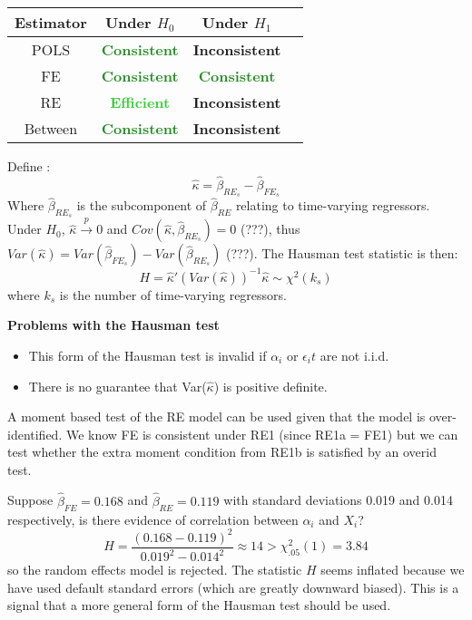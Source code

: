\documentclass[DIV=14,titlepage=false]{scrreprt}
\begin{document}
\begin{table}[h]
    \begin{tabular}{|c|c|c|c|}
        \hline
        Estimator & Under $H_0$ & Under $H_1$ \\
        \hline
        POLS & \textcolor{ForestGreen}{\textbf{Consistent}} & \textcolor{BrickRed}{\textbf{Inconsistent}} \\
        FE & \textcolor{ForestGreen}{\textbf{Consistent}} & \textcolor{ForestGreen}{\textbf{Consistent}} \\
        RE & \textcolor{LimeGreen}{\textbf{Efficient}} & \textcolor{BrickRed}{\textbf{Inconsistent}}\\
        Between & \textcolor{ForestGreen}{\textbf{Consistent}} & \textcolor{BrickRed}{\textbf{Inconsistent}} \\
        \hline
    \end{tabular}
\end{table}
Define : \[
    \hat \kappa = \hat \beta_{RE_s} - \hat \beta_{FE_s}
\]
Where $\hat \beta_{RE_s}$ is the subcomponent of $\hat \beta_{RE}$ relating to time-varying regressors. Under $H_0$, $\hat \kappa \overset{p}{\to} 0$ and $Cov(\hat \kappa, \hat \beta_{RE_s}) = 0$ (???), thus $Var(\hat \kappa) = Var(\hat \beta_{FE_s}) - Var(\hat \beta_{RE_s})$ (???). The Hausman test statistic is then:
\[
    H = \hat \kappa' \left(Var(\hat \kappa)\right)^{-1} \hat \kappa \sim \chi^2(k_s)
\]
where $k_s$ is the number of time-varying regressors.
\begin{note}
    \textbf{Problems with the Hausman test}
    \begin{itemize}
        \item This form of the Hausman test is invalid if $\alpha_i$ or $\epsilon_it$ are not i.i.d.
        \item There is no guarantee that Var($\hat \kappa$) is positive definite.
    \end{itemize}
    A moment based test of the RE model can be used given that the model is over-identified. We know FE is consistent under RE1 (since RE1a = FE1) but we can test whether the extra moment condition from RE1b is satisfied by an overid test.
\end{note}
\begin{example}
    Suppose $\hat \beta_{FE} = 0.168$ and $\hat \beta_{RE} = 0.119$ with standard deviations 0.019 and 0.014 respectively, is there evidence of correlation between $\alpha_i$ and $X_i$?
    \[
        H = \frac{(0.168 - 0.119)^2}{0.019^2 - 0.014^2} \approx 14 > \chi^2_{.05}(1) = 3.84
    \]
    so the random effects model is rejected. The statistic $H$ seems inflated because we have used default standard errors (which are greatly downward biased). This is a signal that a more general form of the Hausman test should be used.
\end{example}
\end{document}
